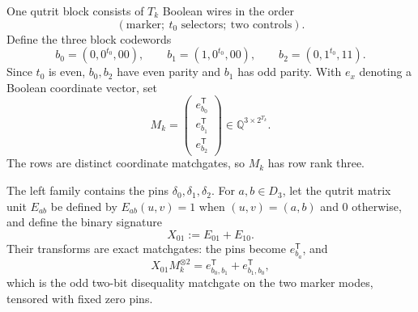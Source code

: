 \documentclass[11pt]{article}
\theoremstyle{definition}
\theoremstyle{remark}
\newcommand{\Q}{\mathbb Q}
\newcommand{\trans}{\mathsf T}
\begin{document}
One qutrit block consists of $T_k$ Boolean wires in the order
\[
  (\text{marker};\ \text{$t_0$ selectors};\ \text{two controls}).
\]
Define the three block codewords
\begin{equation}
  b_0=(0,0^{t_0},00),\qquad
  b_1=(1,0^{t_0},00),\qquad
  b_2=(0,1^{t_0},11).
  \label{eq:controlled-codewords}
\end{equation}
Since $t_0$ is even, $b_0,b_2$ have even parity and $b_1$ has odd parity.
With $e_x$ denoting a Boolean coordinate vector, set
\begin{equation}
  M_k=
  \begin{pmatrix}
    e_{b_0}^{\trans}\\ e_{b_1}^{\trans}\\ e_{b_2}^{\trans}
  \end{pmatrix}
  \in\Q^{3\times2^{T_k}}.
  \label{eq:Mk-definition}
\end{equation}
The rows are distinct coordinate matchgates, so $M_k$ has row rank three.

The left family contains the pins $\delta_0,\delta_1,\delta_2$.  For
$a,b\in D_3$, let the qutrit matrix unit $E_{ab}$ be defined by
$E_{ab}(u,v)=1$ when $(u,v)=(a,b)$ and $0$ otherwise, and define the binary
signature
\[
  X_{01}:=E_{01}+E_{10}.
\]
Their transforms are exact matchgates: the pins become $e_{b_a}^{\trans}$,
and
\begin{equation}
  X_{01}M_k^{\otimes2}
  =e_{b_0,b_1}^{\trans}+e_{b_1,b_0}^{\trans},
  \label{eq:X01-transform}
\end{equation}
which is the odd two-bit disequality matchgate on the two marker modes,
tensored with fixed zero pins.
\end{document}
